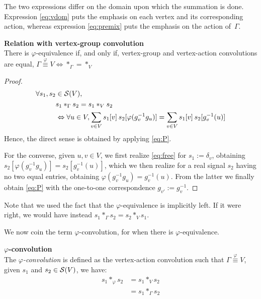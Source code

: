 The two expressions differ on the domain upon which the summation is done. Expression \eqref{eq:vdom} puts the emphasis on each vertex and its corresponding action, whereas expression \eqref{eq:premix} puts the emphasis on the action of~$\Gamma$.

\begin{lemma}\textbf{Relation with vertex-group convolution}\\
There is $\varphi$-equivalence if, and only if, vertex-group and vertex-action convolutions are equal, \ie
$\Gamma \overset{\varphi}{\equiv} V \Leftrightarrow \ast_{\Gamma} = \ast_{V}$
\label{lem:rel23}
\end{lemma}
\begin{proof}
\begin{align}
\forall s_1, s_2 & \in \cs(V),\nonumber\\
& s_1 \ast_{\Gamma} s_2 = s_1 \ast_{V} s_2 \nonumber\\
& \Leftrightarrow \forall u \in V,
\displaystyle \sum_{v \in V} s_1[v] \h{2} s_2[\varphi(g_v^{-1}g_u)] = \displaystyle \sum_{v \in V} s_1[v] \h{2} s_2[g_v^{-1}(u)] \label{eq:free}
\end{align}
Hence, the direct sense is obtained by applying \eqref{eq:P}.

For the converse, given $u, v \in V$, we first realize \eqref{eq:free} for $s_1 := \delta_v$, obtaining $s_2[\varphi(g_v^{-1}g_u)] = s_2[g_v^{-1}(u)]$, which we then realize for a real signal $s_2$ having no two equal entries, obtaining $\varphi(g_v^{-1}g_u) = g_v^{-1}(u)$. From the latter we finally obtain \eqref{eq:P} with the one-to-one correspondence $g_{v'} := g_v^{-1}$.
\end{proof}

\begin{remark}Note that we used the fact that the $\varphi$-equivalence is implicitly left. If it were right, we would have instead $s_1 \ast_{\Gamma} s_2 = s_2 \ast_{V} s_1$.

\end{remark}

We now coin the term $\varphi$-convolution, for when there is $\varphi$-equivalence.

\begin{definition}\textbf{$\varphi$-convolution}\\
The \emph{$\varphi$-convolution} is defined as the vertex-action convolution such that $\Gamma \overset{\varphi}{\equiv} V$, \ie given $s_1$ and $s_2 \in \cs(V)$, we have:
\begin{align*}
s_1 \ast_{\varphi} s_2 &= s_1 \ast_{V} s_2\\
&= s_1 \ast_{\Gamma} s_2
\end{align*}
\label{def:convv}
\end{definition}

